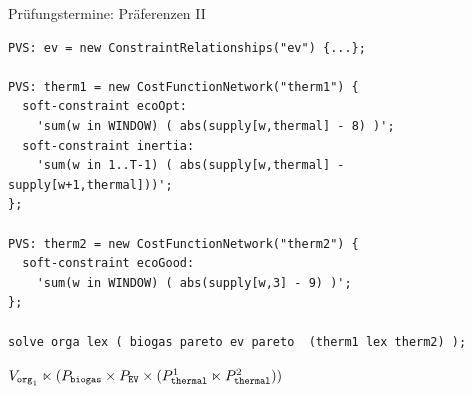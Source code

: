 \begin{frame}[fragile]{Prüfungstermine: Präferenzen II} \small

\begin{lstlisting}
PVS: ev = new ConstraintRelationships("ev") {...}; 

PVS: therm1 = new CostFunctionNetwork("therm1") {
  soft-constraint ecoOpt: 
    'sum(w in WINDOW) ( abs(supply[w,thermal] - 8) )';
  soft-constraint inertia: 
    'sum(w in 1..T-1) ( abs(supply[w,thermal] - supply[w+1,thermal]))';
};

PVS: therm2 = new CostFunctionNetwork("therm2") {
  soft-constraint ecoGood: 
    'sum(w in WINDOW) ( abs(supply[w,3] - 9) )';
};

solve orga lex ( biogas pareto ev pareto  (therm1 lex therm2) );
\end{lstlisting}
$V_{\mathtt{org}_1} \ltimes (P_{\mathtt{biogas}} \times P_{\mathtt{EV}} \times (P_{\mathtt{thermal}}^1 \ltimes P_{\mathtt{thermal}}^2))$
\end{frame}
